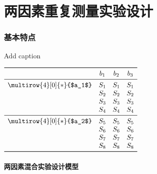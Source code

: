 \setchapterpreamble[u]{\margintoc}
\chapter{两因素重复测量实验设计}


\subsection{基本特点}

\begin{margintable}
  \centering
  \caption{Add caption}
    \begin{math}    
        \begin{array}{cccc}
        \toprule
               & b_1 & b_2 & b_3\\
        \midrule
        \multirow{4}[0]{*}{$a_1$} & S_1    & S_1    & S_1 \\
               & S_2    & S_2    & S_2 \\
               & S_3    & S_3    & S_3 \\
               & S_4    & S_4    & S_4 \\
        \midrule
        \multirow{4}[0]{*}{$a_2$} & S_5    & S_5    & S_5 \\
               & S_6    & S_6    & S_6 \\
               & S_7    & S_7    & S_7 \\
               & S_8    & S_8    & S_8 \\
        \bottomrule
        \end{array}
    \end{math}
  \label{tab:addlabel}
\end{margintable}

\subsubsection{两因素混合实验设计模型}

